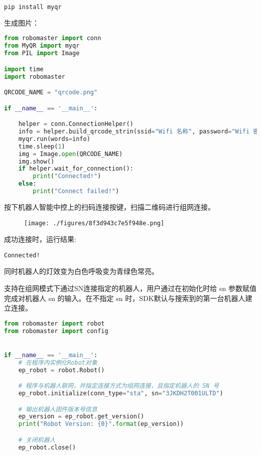 \begin{lstlisting}[language=bash]
pip install myqr
\end{lstlisting}

生成图片：

\begin{lstlisting}[language=python]
from robomaster import conn
from MyQR import myqr
from PIL import Image

import time
import robomaster

QRCODE_NAME = "qrcode.png"

if __name__ == '__main__':

    helper = conn.ConnectionHelper()
    info = helper.build_qrcode_strin(ssid="Wifi 名称", password="Wifi 密码")
    myqr.run(words=info)
    time.sleep(1)
    img = Image.open(QRCODE_NAME)
    img.show()
    if helper.wait_for_connection():
        print("Connected!")
    else:
        print("Connect failed!")
\end{lstlisting}

按下机器人智能中控上的扫码连接按键，扫描二维码进行组网连接。

\begin{figure}[ht]
\centering
\texttt{[image: ./figures/8f3d943c7e5f948e.png]}
\caption{} \label{fig_PyRM2_4}
\end{figure}

成功连接时，运行结果:
\begin{lstlisting}[language=pythonC]
Connected!
\end{lstlisting}

同时机器人的灯效变为白色呼吸变为青绿色常亮。

支持在组网模式下通过SN连接指定的机器人，用户通过在初始化时给 sn 参数赋值完成对机器人 sn 的输入。在不指定 sn 时，SDK默认与搜索到的第一台机器人建立连接。

\begin{lstlisting}[language=python]
from robomaster import robot
from robomaster import config


if __name__ == '__main__':
    # 在程序内实例化Robot对象
    ep_robot = robot.Robot()

    # 程序与机器人联网，并指定连接方式为组网连接，且指定机器人的 SN 号
    ep_robot.initialize(conn_type="sta", sn="3JKDH2T001ULTD")

    # 输出机器人固件版本号信息
    ep_version = ep_robot.get_version()
    print("Robot Version: {0}".format(ep_version))

    # 关闭机器人
    ep_robot.close()
\end{lstlisting}
